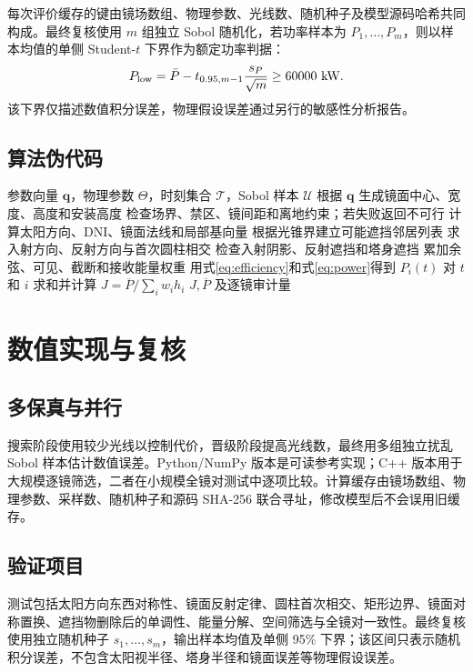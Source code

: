 \documentclass[UTF8,a4paper,11pt]{ctexart}
\newcommand{\vect}[1]{\bm{#1}}
\begin{document}
每次评价缓存的键由镜场数组、物理参数、光线数、随机种子及模型源码哈希共同构成。最终复核使用 $m$ 组独立 Sobol 随机化，若功率样本为 $P_1,\ldots,P_m$，则以样本均值的单侧 Student-$t$ 下界作为额定功率判据：
\begin{equation}
 P_{\rm low}=\bar P-t_{0.95,m-1}\frac{s_P}{\sqrt m}\ge60000\ \si{kW}.
 \label{eq:lowerbound}
\end{equation}
该下界仅描述数值积分误差，物理假设误差通过另行的敏感性分析报告。

\subsection{算法伪代码}
\begin{algorithm}[H]
\caption{统一镜型和异构镜型的共同评价框架}\label{alg:evaluate}
\begin{algorithmic}[1]
\Require 参数向量 $\vect q$，物理参数 $\Theta$，时刻集合 $\mathcal T$，Sobol 样本 $\mathcal U$
\State 根据 $\vect q$ 生成镜面中心、宽度、高度和安装高度
\State 检查场界、禁区、镜间距和离地约束；若失败返回不可行
  \State 计算太阳方向、DNI、镜面法线和局部基向量
  \State 根据光锥界建立可能遮挡邻居列表
      \State 求入射方向、反射方向与首次圆柱相交
      \State 检查入射阴影、反射遮挡和塔身遮挡
      \State 累加余弦、可见、截断和接收能量权重
    \EndFor
    \State 用式\eqref{eq:efficiency}和式\eqref{eq:power}得到 $P_i(t)$
  \EndFor
  \EndFor
\State 对 $t$ 和 $i$ 求和并计算 $J=\overline P/\sum_iw_ih_i$
\State \Return $J,\overline P$ 及逐镜审计量
\end{algorithmic}
\end{algorithm}

\section{数值实现与复核}
\subsection{多保真与并行}
搜索阶段使用较少光线以控制代价，晋级阶段提高光线数，最终用多组独立扰乱 Sobol 样本估计数值误差。Python/NumPy 版本是可读参考实现；C++ 版本用于大规模逐镜筛选，二者在小规模全镜对测试中逐项比较。计算缓存由镜场数组、物理参数、采样数、随机种子和源码 SHA-256 联合寻址，修改模型后不会误用旧缓存。

\subsection{验证项目}
测试包括太阳方向东西对称性、镜面反射定律、圆柱首次相交、矩形边界、镜面对称置换、遮挡物删除后的单调性、能量分解、空间筛选与全镜对一致性。最终复核使用独立随机种子 $s_1,\ldots,s_m$，输出样本均值及单侧 95\% 下界；该区间只表示随机积分误差，不包含太阳视半径、塔身半径和镜面误差等物理假设误差。
\end{document}
